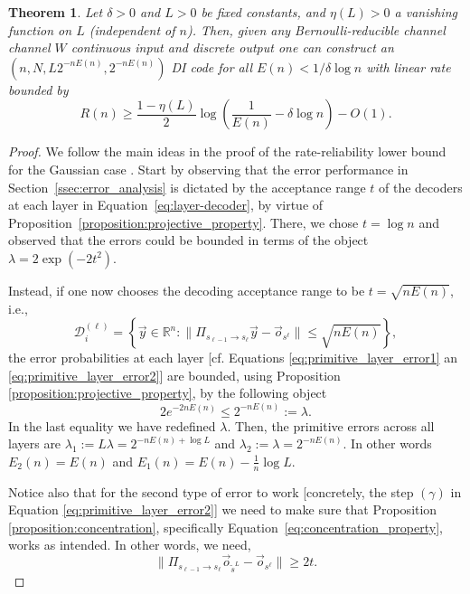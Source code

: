 \documentclass[10pt, conference]{IEEEtran}
\newtheorem{theorem}{Theorem}
\newcommand{\1}{\mathds{1}}
\newcommand{\RR}{\mathbb{R}}
\newcommand{\cD}{\mathcal{D}}
\begin{document}
\begin{theorem}\label{thm:RR_Bern}
Let $\delta>0$ and $L>0$ be fixed constants, and $\eta(L)>0$ a vanishing function on $L$ (independent of $n$). Then, given any Bernoulli-reducible channel channel $W$ continuous input and discrete output one can construct an $(n,N,L2^{-nE(n)},2^{-nE(n)})$ DI code for all $E(n)<1/\delta\log n$ with linear rate bounded by
\[
R(n)\geq\frac{1-\eta(L)}{2}\log\left(\frac{1}{E(n)}-\delta\log n\right)-O(1).
\]
\end{theorem}

\begin{proof}
We follow the main ideas in the proof of the rate-reliability lower bound for the Gaussian case \cite[Thm.~15]{CDBW:Gauss}. Start by observing that the error performance in Section~\ref{ssec:error_analysis} is dictated by the acceptance range $t$ of the decoders at each layer in Equation~\eqref{eq:layer-decoder}, by virtue of Proposition~\ref{proposition:projective_property}. There, we chose $t=\log n$ and observed that the errors could be bounded in terms of the object $\lambda=2\exp(-2t^2)$.

Instead, if one now chooses the decoding acceptance range to be $t=\sqrt{nE(n)}$, i.e.,
\begin{equation}
\cD_{i}^{(\ell)}=\left\{\vec{y}\in\RR^n:\|\Pi_{s_{\ell-1}\to s_{\ell}}\vec{y}-\vec{o}_{s^\ell}\|\leq\sqrt{nE(n)}\right\},
\end{equation}
the error probabilities at each layer [cf. Equations \eqref{eq:primitive_layer_error1} an \eqref{eq:primitive_layer_error2}] are bounded, using Proposition \ref{proposition:projective_property}, by the following object
\begin{equation}
2e^{-2nE(n)}\leq2^{-nE(n)}:=\lambda.
\end{equation}
In the last equality we have redefined $\lambda$. Then, the primitive errors across all layers are $\lambda_1:=L\lambda=2^{-nE(n)+\log L}$ and $\lambda_2:=\lambda=2^{-nE(n)}$. In other words $E_2(n)=E(n)$ and $E_1(n)=E(n)-\frac1n\log L$.

Notice also that for the second type of error to work [concretely, the step $(\gamma)$ in Equation \eqref{eq:primitive_layer_error2}] we need to make sure that Proposition \ref{proposition:concentration}, specifically Equation~\eqref{eq:concentration_property}, works as intended. In other words, we need,
\begin{equation}\label{eq:RR_concentration_property}
\|\Pi_{s_{\ell-1}\to s_\ell}\vec o_{\tilde s^L}-\vec o_{s^\ell}\|\geq 2t.
\end{equation}


\end{proof}
\end{document}
